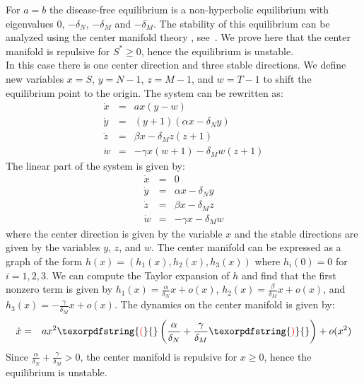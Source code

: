 \documentclass[a4paper, 12pt]{article}
\providecommand{\DIFaddtex}[1]{{\protect\color{blue} \sf #1}} %
\providecommand{\DIFdeltex}[1]{{\protect\color{red} \scriptsize #1}} %
\providecommand{\DIFaddbegin}{} %
\providecommand{\DIFaddend}{} %
\providecommand{\DIFdelbegin}{} %
\providecommand{\DIFdelend}{} %
\providecommand{\DIFadd}[1]{\texorpdfstring{\DIFaddtex{#1}}{#1}} %
\providecommand{\DIFdel}[1]{\texorpdfstring{\DIFdeltex{#1}}{}} %
\begin{document}
\par For $a=b$ the disease-free equilibrium is a non-hyperbolic equilibrium with eigenvalues $0$, $-\delta_N$, $-\delta_M$ and $-\delta_M$. 
The stability of this equilibrium can be analyzed using \DIFaddbegin \DIFadd{the }\DIFaddend center manifold theory\DIFaddbegin \DIFadd{, see~\cite{perko}}\DIFaddend . We prove here that the center manifold is repulsive for $S^* \geq 0$, hence the equilibrium is unstable.\\
In this case there is one center direction and three stable directions. We define new variables $x=S$, $y=N-1$, $z=M-1$, and $w=T-1$ to shift the equilibrium point to the origin. The system can be rewritten as:
\begin{eqnarray*}
\dot{x} &=&  ax (y - w) \\
\dot{y} &=& (y+1)(\alpha x - \delta_N y ) \\
\dot{z} &=& \beta x - \delta_M z (z+1)\\
\dot{w} &=& -\gamma x(w + 1) - \delta_M w (z+ 1)
\end{eqnarray*} 
The linear part of the system is given by:
\begin{eqnarray*}
\dot{x} &=& 0 \\
\dot{y} &=&\alpha x - \delta_N y \\
\dot{z} &=&\beta x - \delta_M z \\
\dot{w} &=&-\gamma x - \delta_M w
\end{eqnarray*}
where the center direction is given by the variable $x$ and the stable directions are given by the variables $y$, $z$, and $w$.
The center manifold can be expressed as a graph of the form $h(x) = (h_1(x), h_2(x), h_3(x))$ where $h_i(0) = 0$ for $i=1,2,3$.
We can compute the Taylor expansion of $h$ and find that the first nonzero term is given by $h_1(x) = \frac{\alpha}{\delta_N} x + o(x)$, $h_2(x) = \frac{\beta}{\delta_M} x + o(x)$, and $h_3(x) = -\frac{\gamma}{\delta_M} x + o(x)$.
The dynamics on the center manifold is given by: 
\begin{eqnarray*}
\dot{x} &=& ax^2\DIFdelbegin \DIFdel{(}\DIFdelend \DIFaddbegin \left(\DIFaddend \frac{\alpha}{\delta_N}+ \frac{\gamma}{\delta_M}\DIFdelbegin \DIFdel{) }\DIFdelend \DIFaddbegin \right) \DIFaddend + o(x^2)
\end{eqnarray*}
Since $\frac{\alpha}{\delta_N}+ \frac{\gamma}{\delta_M} > 0$, the center manifold is repulsive for $x \geq 0$, hence the equilibrium is unstable.
\end{document}
